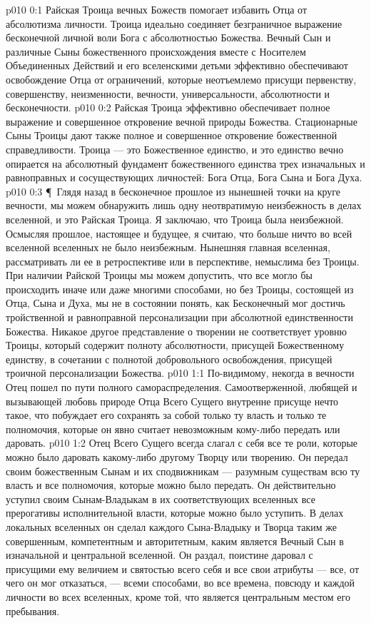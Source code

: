 \author{Вселенский Цензор}
\vs p010 0:1 Райская Троица вечных Божеств помогает избавить Отца от абсолютизма личности. Троица идеально соединяет безграничное выражение бесконечной личной воли Бога с абсолютностью Божества. Вечный Сын и различные Сыны божественного происхождения вместе с Носителем Объединенных Действий и его вселенскими детьми эффективно обеспечивают освобождение Отца от ограничений, которые неотъемлемо присущи первенству, совершенству, неизменности, вечности, универсальности, абсолютности и бесконечности.
\vs p010 0:2 Райская Троица эффективно обеспечивает полное выражение и совершенное откровение вечной природы Божества. Стационарные Сыны Троицы дают также полное и совершенное откровение божественной справедливости. Троица --- это Божественное единство, и это единство вечно опирается на абсолютный фундамент божественного единства трех изначальных и равноправных и сосуществующих личностей: Бога Отца, Бога Сына и Бога Духа.
\vs p010 0:3 \P\ Глядя назад в бесконечное прошлое из нынешней точки на круге вечности, мы можем обнаружить лишь одну неотвратимую неизбежность в делах вселенной, и это Райская Троица. Я заключаю, что Троица была неизбежной. Осмысляя прошлое, настоящее и будущее, я считаю, что больше ничто во всей вселенной вселенных не было неизбежным. Нынешняя главная вселенная, рассматривать ли ее в ретроспективе или в перспективе, немыслима без Троицы. При наличии Райской Троицы мы можем допустить, что все могло бы происходить иначе или даже многими способами, но без Троицы, состоящей из Отца, Сына и Духа, мы не в состоянии понять, как Бесконечный мог достичь тройственной и равноправной персонализации при абсолютной единственности Божества. Никакое другое представление о творении не соответствует уровню Троицы, который содержит полноту абсолютности, присущей Божественному единству, в сочетании с полнотой добровольного освобождения, присущей троичной персонализации Божества.
\vs p010 1:1 По\hyp{}видимому, некогда в вечности Отец пошел по пути полного самораспределения. Самоотверженной, любящей и вызывающей любовь природе Отца Всего Сущего внутренне присуще нечто такое, что побуждает его сохранять за собой только ту власть и только те полномочия, которые он явно считает невозможным кому\hyp{}либо передать или даровать.
\vs p010 1:2 Отец Всего Сущего всегда слагал с себя все те роли, которые можно было даровать какому\hyp{}либо другому Творцу или творению. Он передал своим божественным Сынам и их сподвижникам --- разумным существам всю ту власть и все полномочия, которые можно было передать. Он действительно уступил своим Сынам\hyp{}Владыкам в их соответствующих вселенных все прерогативы исполнительной власти, которые можно было уступить. В делах локальных вселенных он сделал каждого Сына\hyp{}Владыку и Творца таким же совершенным, компетентным и авторитетным, каким является Вечный Сын в изначальной и центральной вселенной. Он раздал, поистине даровал с присущими ему величием и святостью всего себя и все свои атрибуты --- все, от чего он мог отказаться, --- всеми способами, во все времена, повсюду и каждой личности во всех вселенных, кроме той, что является центральным местом его пребывания.
